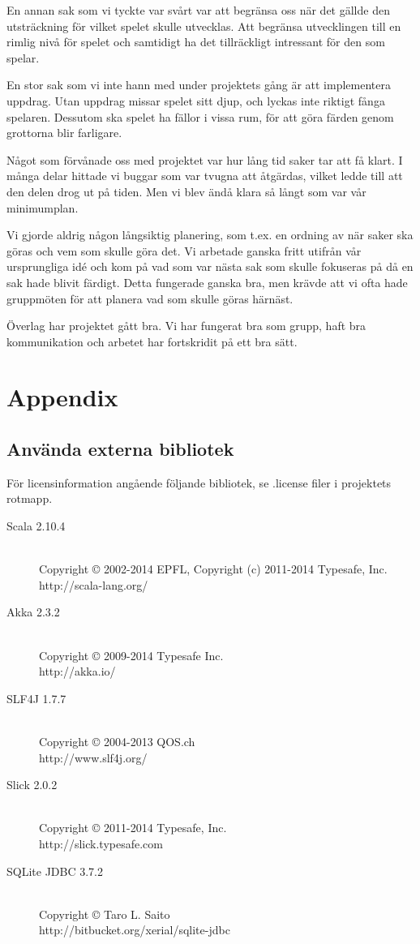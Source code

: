 \documentclass[a4paper]{article}
\begin{document}
 En annan sak som vi tyckte var svårt var att 
begränsa oss när det gällde den utsträckning för vilket spelet skulle utvecklas. Att begränsa utvecklingen till en rimlig nivå för spelet 
och samtidigt ha det tillräckligt intressant för den som spelar.

En stor sak som vi inte hann med under projektets gång är att implementera uppdrag. Utan uppdrag missar spelet sitt djup, och lyckas inte riktigt fånga spelaren. Dessutom ska spelet ha fällor i vissa rum, för att göra färden genom grottorna blir farligare. 

Något som förvånade oss med projektet var hur lång tid saker tar att få klart. I många delar hittade vi buggar som var tvugna att åtgärdas, vilket ledde till att den delen drog ut på tiden. Men vi blev ändå klara så långt som var vår minimumplan. 

Vi gjorde aldrig någon långsiktig planering, som t.ex. en ordning av när saker ska göras och vem som skulle göra det. Vi arbetade ganska fritt utifrån vår ursprungliga idé och kom på vad som var nästa sak som skulle fokuseras på då en sak hade blivit färdigt. Detta fungerade ganska bra, men krävde att vi ofta hade gruppmöten för att planera vad som skulle göras härnäst. 

Överlag har projektet gått bra. Vi har fungerat bra som grupp, haft bra kommunikation och arbetet har fortskridit på ett bra sätt.


\section{Appendix}
\subsection{Använda externa bibliotek}
För licensinformation angående följande bibliotek, se .license filer i projektets rotmapp.
\begin{description}
\item[Scala 2.10.4] \hfill \\ Copyright © 2002-2014 EPFL, Copyright (c) 2011-2014 Typesafe, Inc.\hfill \\http://scala-lang.org/
\item[Akka 2.3.2] \hfill \\ Copyright © 2009-2014 Typesafe Inc.\hfill \\ http://akka.io/
\item[SLF4J 1.7.7] \hfill \\ Copyright © 2004-2013 QOS.ch\hfill \\ http://www.slf4j.org/
\item[Slick 2.0.2] \hfill \\ Copyright © 2011-2014 Typesafe, Inc.\hfill \\ http://slick.typesafe.com
\item[SQLite JDBC 3.7.2] \hfill \\ Copyright © Taro L. Saito\hfill \\ http://bitbucket.org/xerial/sqlite-jdbc
\end{description}
\end{document}
